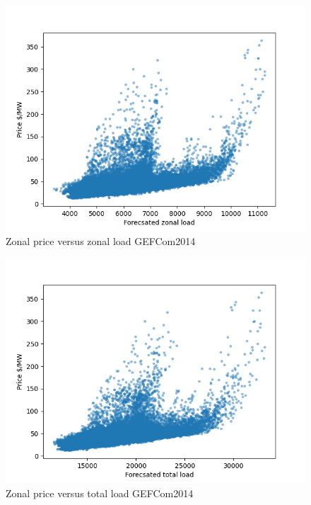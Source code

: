\begin{figure}[!h]
    \includegraphics[width=\textwidth]{images/gefcom_zonal_price_vs_zonal_load.png}
    \caption{Zonal price versus zonal load GEFCom2014}
    \label{fig:gefcom_zonal_price_vs_zonal_load}
\end{figure}


\begin{figure}[!h]
    \includegraphics[width=\textwidth]{images/gefcom_zonal_price_vs_total_load.png}
    \caption{Zonal price versus total load GEFCom2014}
    \label{fig:gefcom_zonal_price_vs_total_load}
\end{figure}

